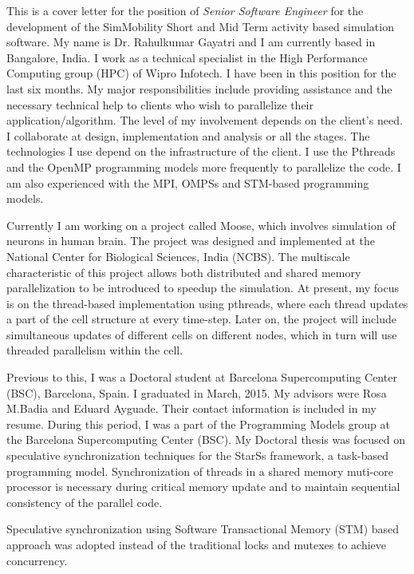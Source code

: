 \documentclass[10pt,stdletter,dateno]{newlfm}
\begin{document}
\begin{newlfm}
	   This is a cover letter for the position of {\it Senior Software Engineer} for the development of the SimMobility Short and Mid Term activity based simulation software.
	   My name is Dr. Rahulkumar Gayatri and I am currently based in Bangalore, India.
	   I work as a technical specialist in the High Performance Computing group (HPC) of Wipro Infotech.
	   I have been in this position for the last six months.
	   My major responsibilities include providing assistance and the necessary technical help to clients who wish to parallelize their application/algorithm.
	   The level of my involvement depends on the client's need. I collaborate at design, implementation and analysis or all the stages.
	   The technologies I use depend on the infrastructure of the client. I use the Pthreads and the OpenMP programming models more frequently to parallelize the code.
	   I am also experienced with the MPI, OMPSs and STM-based programming models.
%
	   \par
	   Currently I am working on a project called Moose, which involves simulation of neurons in human brain.
	   The project was designed and implemented at the National Center for Biological Sciences, India (NCBS).
	   The multiscale characteristic of this project allows both distributed and shared memory parallelization to be introduced to speedup the simulation.
	   At present, my focus is on the thread-based implementation using pthreads, where each thread updates a part of the cell structure at every time-step.
	   Later on, the project will include simultaneous updates of different cells on different nodes, which in turn will use threaded parallelism within the cell.
%
	   \par
	   Previous to this, I was a Doctoral student at Barcelona Supercomputing Center (BSC), Barcelona, Spain. I graduated in March, 2015.
	   My advisors were Rosa M.Badia and Eduard Ayguade. Their contact information is included in my resume.
	   During this period, I was a part of the Programming Models group at the Barcelona Supercomputing Center (BSC).
	   My Doctoral thesis was focused on speculative synchronization techniques for the StarSs framework, a task-based programming model.
	   Synchronization of threads in a shared memory muti-core processor is necessary during critical memory update and to maintain sequential consistency of the parallel code.
%
	   \par
	   Speculative synchronization using Software Transactional Memory (STM) based approach was adopted instead of the traditional locks and mutexes to achieve concurrency.

\end{newlfm}
\end{document}
